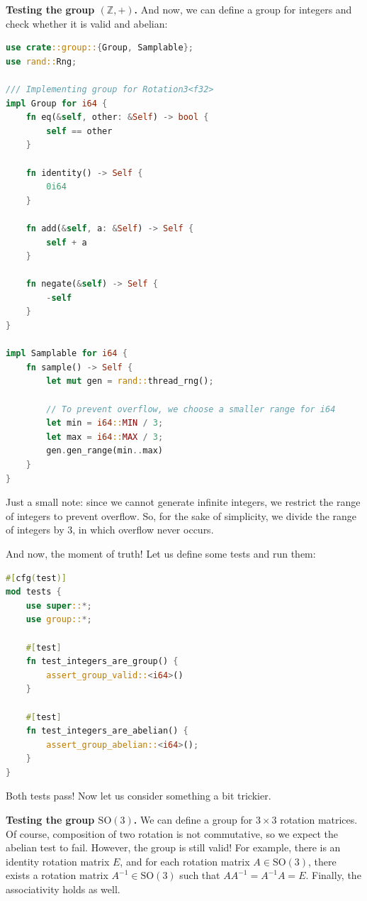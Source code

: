 \documentclass[../lecture-notes-148x210.tex]{subfiles}
\begin{document}
\textbf{Testing the group $(\mathbb{Z}, +)$.} And now, we can define a group for integers and check whether it is valid and abelian:
\begin{lstlisting}[language=Rust]
use crate::group::{Group, Samplable};
use rand::Rng;

/// Implementing group for Rotation3<f32>
impl Group for i64 {
    fn eq(&self, other: &Self) -> bool {
        self == other
    }

    fn identity() -> Self {
        0i64
    }

    fn add(&self, a: &Self) -> Self {
        self + a
    }

    fn negate(&self) -> Self {
        -self
    }
}

impl Samplable for i64 {
    fn sample() -> Self {
        let mut gen = rand::thread_rng();

        // To prevent overflow, we choose a smaller range for i64
        let min = i64::MIN / 3; 
        let max = i64::MAX / 3;
        gen.gen_range(min..max)
    }
}
\end{lstlisting}

Just a small note: since we cannot generate infinite integers, we restrict the range of integers to prevent overflow. So, 
for the sake of simplicity, we divide the range of integers by $3$, in which overflow never occurs.

And now, the moment of truth! Let us define some tests and run them:
\begin{lstlisting}[language=Rust]
#[cfg(test)]
mod tests {
    use super::*;
    use group::*;

    #[test]
    fn test_integers_are_group() {
        assert_group_valid::<i64>()
    }

    #[test]
    fn test_integers_are_abelian() {
        assert_group_abelian::<i64>();
    }
}
\end{lstlisting}

Both tests pass! Now let us consider something a bit trickier.

\textbf{Testing the group $\text{SO}(3)$.} We can define a group for $3 \times 3$ rotation matrices. Of course, 
composition of two rotation is not commutative, so we expect the abelian test to fail. However, the group is still 
valid! For example, there is an identity rotation matrix $E$, and for each rotation matrix $A \in \text{SO}(3)$, 
there exists a rotation matrix $A^{-1} \in \text{SO}(3)$ such that $AA^{-1} = A^{-1}A = E$. Finally, the associativity 
holds as well.
\end{document}
